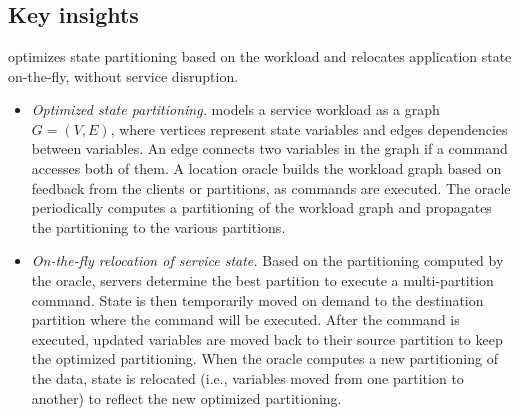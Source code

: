 \section{\dynastar}
\label{sec:dynastar}

\subsection{Key insights}

\dynastar optimizes state partitioning based on the workload and relocates application state on-the-fly, without service disruption.
\begin{itemize}
\item \emph{Optimized state partitioning.}
\dynastar models a service workload as a graph $G = (V, E)$, where vertices represent state variables and edges dependencies between variables.
An edge connects two variables in the graph if a command accesses both of them.
A location oracle builds the workload graph based on feedback from the clients or partitions, as commands are executed.
The oracle periodically computes a partitioning of the workload graph and propagates the partitioning to the various partitions.

\item \emph{On-the-fly relocation of service state.}
Based on the partitioning computed by the oracle, servers determine the best partition to execute a multi-partition command.
State is then temporarily moved on demand to the destination partition where the command will be executed.
After the command is executed, updated variables are moved back to their source partition to keep the optimized partitioning.
When the oracle computes a new partitioning of the data, state is relocated (i.e., variables moved from one partition to another) to reflect the new optimized partitioning. 
\end{itemize}


